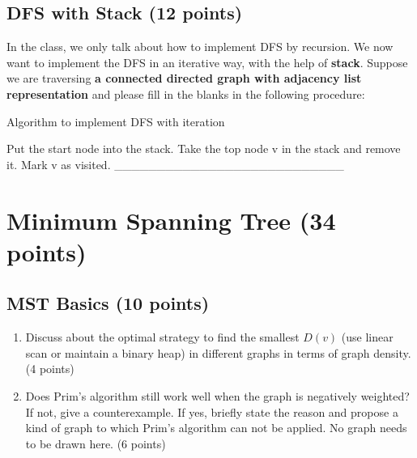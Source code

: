 \documentclass[11pt]{exam}
\begin{document}
\subsection{DFS with Stack (12 points)}
    In the class, we only talk about how to implement DFS by recursion. We now want to implement the DFS in an iterative way, with the help of \textbf{stack}.
    \newline
    \newline
    Suppose we are traversing \textbf{a connected directed graph with adjacency list representation} and please fill in the blanks in the following procedure:
    \begin{algorithm}
        \caption{Algorithm to implement DFS with iteration}
        \begin{algorithmic}[1]
            \STATE Put the start node into the stack.
            \WHILE{\_\_\_\_\_\_\_\_\_\_\_\_\_\_\_\_\_\_\_\_\_\_\_\_\_\_\_}
                \STATE Take the top node v in the stack and remove it.
                \STATE Mark v as visited.
                \FOR{\_\_\_\_\_\_\_\_\_\_\_\_\_\_\_\_\_\_\_\_\_\_\_\_\_\_\_}
                    \IF{\_\_\_\_\_\_\_\_\_\_\_\_\_\_\_\_\_\_\_\_\_\_\_\_\_\_\_}
                        \STATE \_\_\_\_\_\_\_\_\_\_\_\_\_\_\_\_\_\_\_\_\_\_\_\_\_\_\_
                    \ENDIF
                \ENDFOR
            \ENDWHILE
        \end{algorithmic}
    \end{algorithm}

\section{Minimum Spanning Tree (34 points)}
\subsection{MST Basics (10 points)}
\begin{enumerate}[1)]
    \item Discuss about the optimal strategy to find the smallest $D(v)$ (use linear scan or maintain a binary heap) in different graphs in terms of graph density. (4 points)
    \begin{solution}
    \end{solution}
    \item Does Prim's algorithm still work well when the graph is negatively weighted? If not, give a counterexample. If yes, briefly state the reason and propose a kind of graph to which Prim's algorithm can not be applied. No graph needs to be drawn here. (6 points)
    \begin{solution}
    \end{solution}
\end{enumerate}
\end{document}
